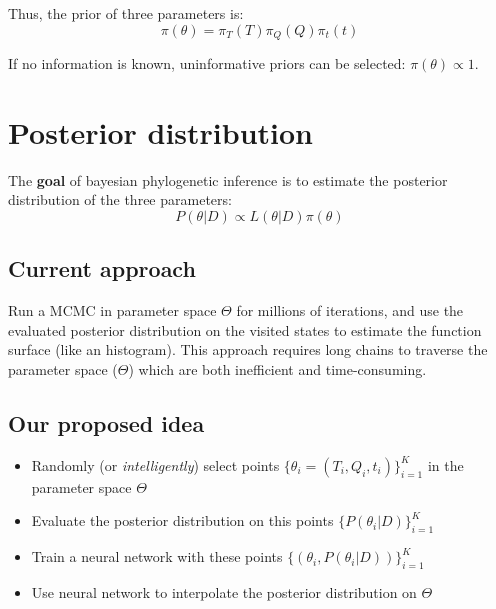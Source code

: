 \documentclass[]{article}
\providecommand{\tightlist}{%
  \setlength{\itemsep}{0pt}\setlength{\parskip}{0pt}}
\begin{document}
Thus, the prior of three parameters is: \[
\pi(\theta) = \pi_T(T) \pi_Q(Q) \pi_t(t)
\]

If no information is known, uninformative priors can be selected:
\(\pi(\theta) \propto 1\).

\hypertarget{posterior-distribution}{%
\section{Posterior distribution}\label{posterior-distribution}}

The \textbf{goal} of bayesian phylogenetic inference is to estimate the
posterior distribution of the three parameters: \[
P(\theta | D) \propto L(\theta|D) \pi(\theta)
\]

\hypertarget{current-approach}{%
\subsection{Current approach}\label{current-approach}}

Run a MCMC in parameter space \(\Theta\) for millions of iterations, and
use the evaluated posterior distribution on the visited states to
estimate the function surface (like an histogram). This approach
requires long chains to traverse the parameter space (\(\Theta\)) which
are both inefficient and time-consuming.

\hypertarget{our-proposed-idea}{%
\subsection{Our proposed idea}\label{our-proposed-idea}}

\begin{itemize}
\tightlist
\item
  Randomly (or \emph{intelligently}) select points
  \(\{\theta_i = (T_i,Q_i,t_i)\}_{i=1}^K\) in the parameter space
  \(\Theta\)
\item
  Evaluate the posterior distribution on this points
  \(\{P(\theta_i|D)\}_{i=1}^K\)
\item
  Train a neural network with these points
  \(\{(\theta_i, P(\theta_i|D))\}_{i=1}^K\)
\item
  Use neural network to interpolate the posterior distribution on
  \(\Theta\)
\end{itemize}


\end{document}
